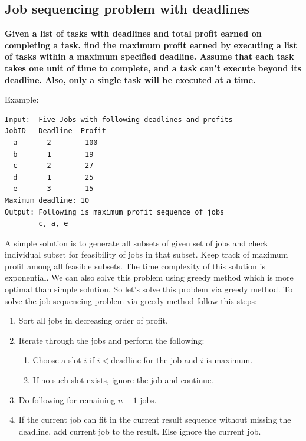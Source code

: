 \documentclass[a4paper,11pt]{book}
\begin{document}
\subsection{Job sequencing problem with deadlines}

\noindent \textbf{Given a list of tasks with deadlines and total profit earned on completing a task, find the maximum profit earned by executing a list of tasks within a maximum specified deadline. Assume that each task takes one unit of time to complete, and a task can't execute beyond its deadline. Also, only a single task will be executed at a time.}

\vspace{5mm}

\noindent Example:
\begin{lstlisting}
Input:  Five Jobs with following deadlines and profits
JobID   Deadline  Profit
  a       2        100
  b       1        19
  c       2        27
  d       1        25
  e       3        15
Maximum deadline: 10
Output: Following is maximum profit sequence of jobs
        c, a, e
\end{lstlisting}

\noindent A simple solution is to generate all subsets of given set of jobs and check individual subset for feasibility of jobs in that subset. Keep track of maximum profit among all feasible subsets. The time complexity of this solution is exponential. We can also solve this problem using greedy method which is more optimal than simple solution. So let's solve this problem via greedy method. 
To solve the job sequencing problem via greedy method follow this steps:

\begin{enumerate}
    \item Sort all jobs in decreasing order of profit.
    \item Iterate through the jobs and perform the following:
    \begin{enumerate}
        \item Choose a slot $i$ if $i<\text{deadline}$ for the job and $i$ is maximum.
        \item If no such slot exists, ignore the job and continue.
    \end{enumerate}
    \item Do following for remaining $n-1$ jobs.
    \item If the current job can fit in the current result sequence without missing the deadline, add current job to the result. Else ignore the current job.
\end{enumerate}
\end{document}
